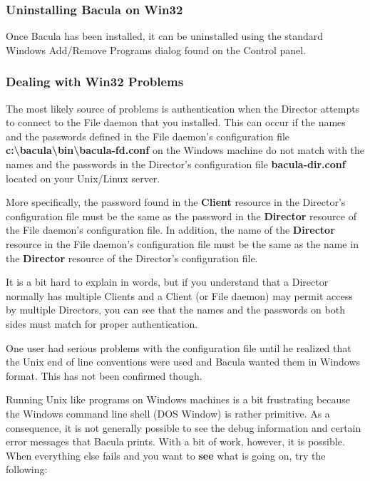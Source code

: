 \subsubsection*{Uninstalling Bacula on Win32}

Once Bacula has been installed, it can be uninstalled using the standard
Windows Add/Remove Programs dialog found on the Control panel. 

\subsubsection*{Dealing with Win32 Problems}
\label{problems}

The most likely source of problems is authentication when the Director
attempts to connect to the File daemon that you installed. This can occur if
the names and the passwords defined in the File daemon's configuration file
{\bf
c:\textbackslash{}bacula\textbackslash{}bin\textbackslash{}bacula-fd.conf} on
the Windows machine do not match with the names and the passwords in the
Director's configuration file {\bf bacula-dir.conf} located on your Unix/Linux
server. 

More specifically, the password found in the {\bf Client} resource in the
Director's configuration file must be the same as the password in the {\bf
Director} resource of the File daemon's configuration file. In addition, the
name of the {\bf Director} resource in the File daemon's configuration file
must be the same as the name in the {\bf Director} resource of the Director's
configuration file. 

It is a bit hard to explain in words, but if you understand that a Director
normally has multiple Clients and a Client (or File daemon) may permit access
by multiple Directors, you can see that the names and the passwords on both
sides must match for proper authentication. 

One user had serious problems with the configuration file until he realized
that the Unix end of line conventions were used and Bacula wanted them in
Windows format. This has not been confirmed though. 

Running Unix like programs on Windows machines is a bit frustrating because
the Windows command line shell (DOS Window) is rather primitive. As a
consequence, it is not generally possible to see the debug information and
certain error messages that Bacula prints. With a bit of work, however, it is
possible. When everything else fails and you want to {\bf see} what is going
on, try the following: 


